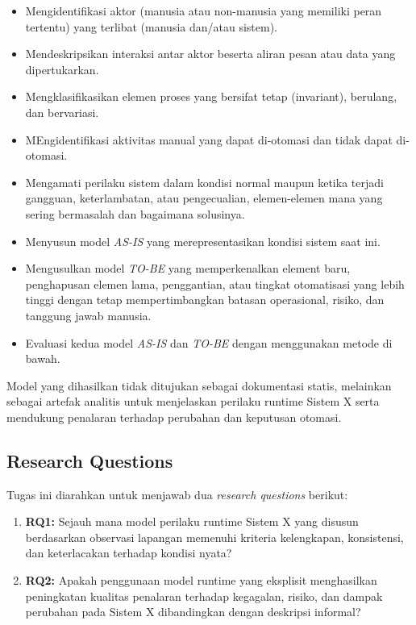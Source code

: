 \begin{itemize}
    \item Mengidentifikasi aktor (manusia atau non-manusia yang memiliki peran tertentu) yang terlibat (manusia dan/atau sistem).
    \item Mendeskripsikan interaksi antar aktor beserta aliran pesan atau data yang dipertukarkan.
    \item Mengklasifikasikan elemen proses yang bersifat tetap (invariant), berulang, dan bervariasi.
	\item MEngidentifikasi aktivitas manual yang dapat di-otomasi dan tidak dapat di-otomasi.
	\item Mengamati perilaku sistem dalam kondisi normal maupun ketika terjadi gangguan, keterlambatan, atau pengecualian, elemen-elemen mana yang sering bermasalah dan bagaimana solusinya.
    \item Menyusun model \textit{AS-IS} yang merepresentasikan kondisi sistem saat ini.
    \item Mengusulkan model \textit{TO-BE} yang memperkenalkan element baru, penghapusan elemen lama, penggantian, atau tingkat otomatisasi yang lebih tinggi dengan tetap mempertimbangkan batasan operasional, risiko, dan tanggung jawab manusia.
	\item Evaluasi kedua model \textit{AS-IS} dan \textit{TO-BE} dengan menggunakan metode di bawah.
\end{itemize}

Model yang dihasilkan tidak ditujukan sebagai dokumentasi statis, melainkan sebagai artefak analitis untuk menjelaskan perilaku runtime Sistem X serta mendukung penalaran terhadap perubahan dan keputusan otomasi.

\subsection*{Research Questions}

Tugas ini diarahkan untuk menjawab dua \textit{research questions} berikut:

\begin{enumerate}
    \item \textbf{RQ1:}
    Sejauh mana model perilaku runtime Sistem X yang disusun berdasarkan observasi lapangan memenuhi kriteria kelengkapan, konsistensi, dan keterlacakan terhadap kondisi nyata?

    \item \textbf{RQ2:}
    Apakah penggunaan model runtime yang eksplisit menghasilkan peningkatan kualitas penalaran terhadap kegagalan, risiko, dan dampak perubahan pada Sistem X dibandingkan dengan deskripsi informal?
\end{enumerate}

